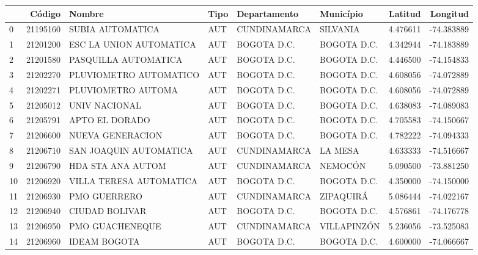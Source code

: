 \documentclass[11pt]{article}
\begin{document}
\begin{table}
\iffalse %
\begin{tabular}{lrllllrr}
\toprule
{} &    Código &                    Nombre & Tipo &  Departamento &         Município &   Latitud &   Longitud \\
\midrule
0   &  21195160 &          SUBIA AUTOMATICA &  AUT &  CUNDINAMARCA &          SILVANIA &  4.476611 & -74.383889 \\
1   &  21201200 &   ESC LA UNION AUTOMATICA &  AUT &   BOGOTA D.C. &       BOGOTA D.C. &  4.342944 & -74.183889 \\
2   &  21201580 &      PASQUILLA AUTOMATICA &  AUT &   BOGOTA D.C. &       BOGOTA D.C. &  4.446500 & -74.154833 \\
3   &  21202270 &    PLUVIOMETRO AUTOMATICO &  AUT &   BOGOTA D.C. &       BOGOTA D.C. &  4.608056 & -74.072889 \\
4   &  21202271 &        PLUVIOMETRO AUTOMA &  AUT &   BOGOTA D.C. &       BOGOTA D.C. &  4.608056 & -74.072889 \\
5   &  21205012 &             UNIV NACIONAL &  AUT &   BOGOTA D.C. &       BOGOTA D.C. &  4.638083 & -74.089083 \\
6   &  21205791 &            APTO EL DORADO &  AUT &   BOGOTA D.C. &       BOGOTA D.C. &  4.705583 & -74.150667 \\
7   &  21206600 &          NUEVA GENERACION &  AUT &   BOGOTA D.C. &       BOGOTA D.C. &  4.782222 & -74.094333 \\
8   &  21206710 &    SAN JOAQUIN AUTOMATICA &  AUT &  CUNDINAMARCA &           LA MESA &  4.633333 & -74.516667 \\
9   &  21206790 &         HDA STA ANA AUTOM &  AUT &  CUNDINAMARCA &           NEMOCÓN &  5.090500 & -73.881250 \\
10  &  21206920 &   VILLA TERESA AUTOMATICA &  AUT &   BOGOTA D.C. &       BOGOTA D.C. &  4.350000 & -74.150000 \\
11  &  21206930 &              PMO GUERRERO &  AUT &  CUNDINAMARCA &         ZIPAQUIRÁ &  5.086444 & -74.022167 \\
12  &  21206940 &            CIUDAD BOLIVAR &  AUT &   BOGOTA D.C. &       BOGOTA D.C. &  4.576861 & -74.176778 \\
13  &  21206950 &           PMO GUACHENEQUE &  AUT &  CUNDINAMARCA &       VILLAPINZÓN &  5.236056 & -73.525083 \\
14  &  21206960 &              IDEAM BOGOTA &  AUT &   BOGOTA D.C. &       BOGOTA D.C. &  4.600000 & -74.066667 \\

\end{tabular}
\end{table}
\end{document}
